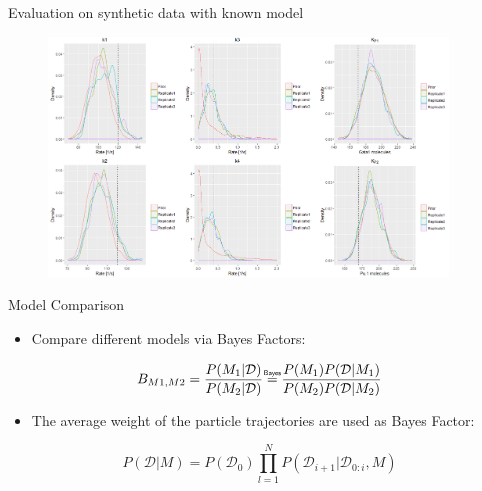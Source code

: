 \documentclass[pdf]
{beamer}
\newcommand\bayeseq{\mathrel{\overset{\makebox[0pt]{\mbox{\normalfont\tiny\sffamily Bayes}}}{=}}}
\begin{document}
\begin{frame}{Evaluation on synthetic data with known model}

	\begin{figure}[ht]
		\begin{center}
			\includegraphics[height=2.5in]{figures/test_vertical.PNG}
		\end{center}
	\end{figure}
\end{frame}

\begin{frame}{Model Comparison}
	\begin{itemize}
		\item Compare different models via Bayes Factors:
	\end{itemize}
	
	\begin{equation}
		B_{M1, M2} = \frac{P(M_1 | \mathcal{D})}{P(M_2 | \mathcal{D})}  \bayeseq \frac{P(M_1) P(\mathcal{D}| M_1)}{P(M_2) P(\mathcal{D} | M_2)} \label{eq:6}
	\end{equation}

	\begin{itemize}
		\item The average weight of the particle trajectories are used as Bayes Factor:
	\end{itemize}

	\begin{equation}
	P(\mathcal{D} | M) = P(\mathcal{D_0}) \prod_{l=1}^{N} P(\mathcal{D}_{i+1} | \mathcal{D}_{0:i}, M)\label{eq:7}
	\end{equation}

\end{frame}
\end{document}
